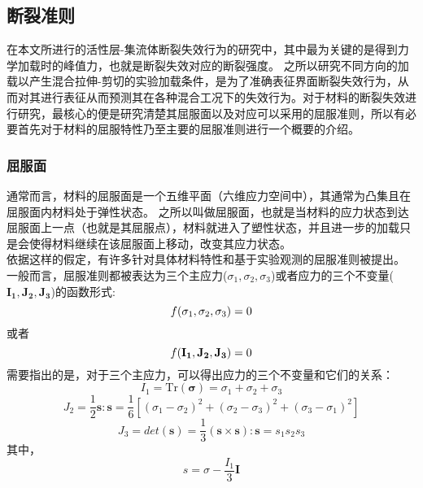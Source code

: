 \subsection{断裂准则}
在本文所进行的活性层-集流体断裂失效行为的研究中，其中最为关键的是得到力学加载时的峰值力，也就是断裂失效对应的断裂强度。 之所以研究不同方向的加载以产生混合拉伸-剪切的实验加载条件，是为了准确表征界面断裂失效行为，从而对其进行表征从而预测其在各种混合工况下的失效行为。对于材料的断裂失效进行研究，最核心的便是研究清楚其屈服面以及对应可以采用的屈服准则，所以有必要首先对于材料的屈服特性乃至主要的屈服准则进行一个概要的介绍。
\subsubsection{屈服面}
通常而言，材料的屈服面是一个五维平面（六维应力空间中），其通常为凸集且在屈服面内材料处于弹性状态。 之所以叫做屈服面，也就是当材料的应力状态到达屈服面上一点（也就是其屈服点），材料就进入了塑性状态，并且进一步的加载只是会使得材料继续在该屈服面上移动，改变其应力状态\cite{Hughes}。\\
\indent 依据这样的假定，有许多针对具体材料特性和基于实验观测的屈服准则被提出。 
一般而言，屈服准则都被表达为三个主应力($\sigma_1,\sigma_2,\sigma_3$)或者应力的三个不变量($\mathbf{I_1},\mathbf{J_2},\mathbf{J_3}$)的函数形式\cite{Hughes}:
\begin{equation}
\mathnormal{f}(\sigma_1,\sigma_2,\sigma_3) = 0
\end{equation}
或者
\begin{equation}
\mathnormal{f}(\mathbf{I_1},\mathbf{J_2},\mathbf{J_3}) = 0
\end{equation}
需要指出的是，对于三个主应力，可以得出应力的三个不变量和它们的关系：
\begin{equation}
I_1 = \mathrm{Tr}(\mathbf{\sigma}) = \sigma_1 + \sigma_2 + \sigma_3
\end{equation}
\begin{equation}
J_2 = \frac{1}{2} \mathbf{s} : \mathbf{s} = \frac{1}{6} \left[(\sigma_1-\sigma_2)^2 + (\sigma_2-\sigma_3)^2 + (\sigma_3-\sigma_1)^2 \right]
\end{equation}
\begin{equation}
J_3 =det(\mathbf{s}) = \frac{1}{3}(\mathbf{s} \times \mathbf{s}) : \mathbf{s} =s_1s_2s_3
\end{equation}
其中，
\begin{equation}
s = \sigma - \frac{I_1}{3}\mathbf{I} 
\end{equation}
